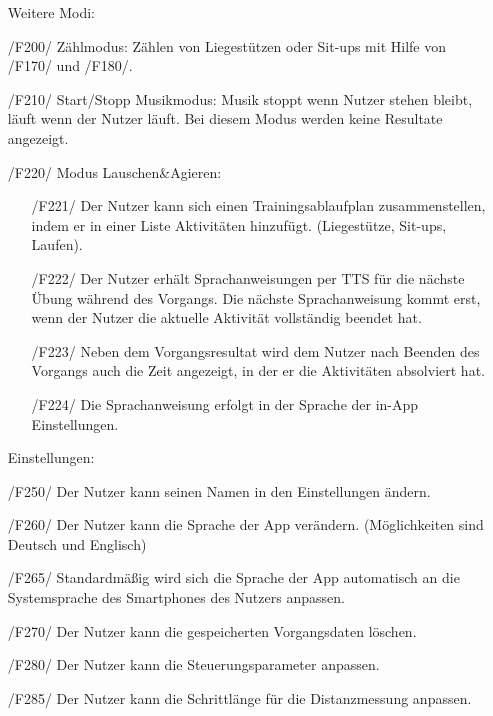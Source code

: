 \documentclass[a4paper,12pt]{article}
\begin{document}
    \begin{itemize}

      \item[] \textsf{Weitere Modi:}
        \item[/F200/] \textsf{Zählmodus:} Zählen von Liegestützen oder Sit-ups mit Hilfe von /F170/ und /F180/.
        \item[/F210/] \textsf{Start/Stopp Musikmodus:} Musik stoppt wenn Nutzer stehen bleibt, läuft wenn der Nutzer läuft. Bei diesem Modus werden keine Resultate angezeigt.
      
 	    \item[/F220/] \textsf{Modus \glqq Lauschen\&Agieren\grqq:}
 	    \begin{itemize}
        \item[/F221/]Der Nutzer kann sich einen Trainingsablaufplan zusammenstellen, indem er in einer Liste Aktivitäten hinzufügt. (Liegestütze, Sit-ups, Laufen). 
        \item[/F222/] Der Nutzer erhält Sprachanweisungen per TTS für die nächste Übung während des Vorgangs. Die nächste Sprachanweisung kommt erst, wenn der Nutzer die aktuelle Aktivität vollständig beendet hat.
        \item[/F223/] Neben dem Vorgangsresultat wird dem Nutzer nach Beenden des Vorgangs auch die Zeit angezeigt, in der er die Aktivitäten absolviert hat.
        \item[/F224/] Die Sprachanweisung erfolgt in der Sprache der in-App Einstellungen.
       \end{itemize}
    
      \item[] \textsf{Einstellungen:}
        \item[/F250/] Der Nutzer kann seinen Namen in den Einstellungen ändern.
        \item[/F260/] Der Nutzer kann die Sprache der App verändern. (Möglichkeiten sind Deutsch und Englisch)
        \item[/F265/] Standardmäßig wird sich die Sprache der App automatisch an die Systemsprache des Smartphones des Nutzers anpassen.
        \item[/F270/] Der Nutzer kann die gespeicherten \Gls{Vorgangsdaten} löschen.
        \item[/F280/] Der Nutzer kann die \Gls{Steuerungsparameter} anpassen. 
        \item[/F285/] Der Nutzer kann die Schrittlänge für die Distanzmessung anpassen.
  

\end{itemize}
\end{document}
